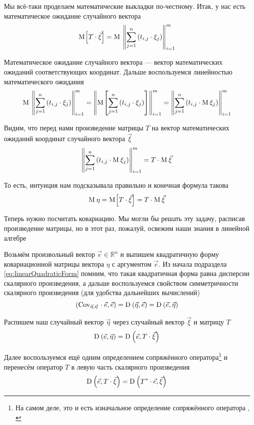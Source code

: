 Мы всё-таки проделаем математические выкладки по-честному.
Итак, у нас есть математическое ожидание случайного вектора
$$\mathrm{M}_{}\!\left[ T \cdot \vec{\xi} \right]
    = \mathrm{M}_{}\,\left\| \sum_{j=1}^n \left( t_{i,j} \cdot \xi_j \right)
        \right\|_{i=1}^m$$

Математическое ожидание случайного вектора --- вектор математических ожиданий
соответствующих координат.
Дальше воспользуемся линейностью математического ожидания
$$\mathrm{M}_{}\,\left\| \sum_{j=1}^n \left( t_{i,j} \cdot \xi_j \right)
        \right\|_{i=1}^m
    = \left\| \mathrm{M}_{}\!\left[ \sum_{j=1}^n \left( t_{i,j} \cdot \xi_j \right) \right]
        \right\|_{i=1}^m
    = \left\| \sum_{j=1}^n \left( t_{i,j} \cdot \mathrm{M}_{}\,\xi_j \right)
        \right\|_{i=1}^m$$

Видим, что перед нами произведение матрицы $T$ на вектор
математических ожиданий координат случайного вектора $\vec{\xi}$
$$\left\| \sum_{j=1}^n \left( t_{i,j} \cdot \mathrm{M}_{}\,\xi_j \right)
    \right\|_{i=1}^m = T \cdot \mathrm{M}_{}\,\vec{\xi}$$

То есть, интуиция нам подсказывала правильно и конечная формула такова
$$\mathrm{M}_{}\,\eta = \mathrm{M}_{}\!\left[ T \cdot \vec{\xi} \right] = T \cdot \mathrm{M}_{}\,\vec{\xi}$$

Теперь нужно посчитать ковариацию. Мы могли бы решать эту задачу,
расписав произведение матрицы, но в этот раз, пожалуй, освежим наши знания
в линейной алгебре

Возьмём произвольный вектор $\vec{e} \in \mathbb{R}^n$
и выпишем квадратичную форму ковариационной матрицы вектора $\eta$
с аргументом $\vec{e}$. Из начала подраздела \eqref{eq:linearQuadraticForm}
помним, что такая квадратичная форма равна дисперсии скалярного произведения, а
дальше воспользуемся свойством симметричности скалярного произведения
(для удобства дальнейших вычислений)
$$\left( \mathrm{Cov}_{\vec{\eta}, \vec{\eta}}\, \cdot \vec{e}, \vec{e} \right)
    = \mathrm{D}_{} \left( \vec{\eta}, \vec{e} \right)
    = \mathrm{D}_{} \left( \vec{e}, \vec{\eta} \right)$$

Распишем наш случайный вектор $\vec{\eta}$ через случайный вектор $\vec{\xi}$
и матрицу $T$
$$\mathrm{D}_{} \left( \vec{e}, \vec{\eta} \right)
    = \mathrm{D}_{} \left( \vec{e}, T \cdot \vec{\xi} \right)$$

Далее воспользуемся ещё одним определением сопряжённого оператора\footnote{На
самом деле, это и есть изначальное определение сопряжённого оператора
\cite[с.~241]{VoevodinLA}, \cite[с.~126]{IlinPoznyarLA}}
и перенесём оператор $T$ в левую часть скалярного произведения
$$\mathrm{D}_{} \left( \vec{e}, T \cdot \vec{\xi} \right)
    = \mathrm{D}_{} \left( T^* \cdot \vec{e}, \vec{\xi} \right)$$

